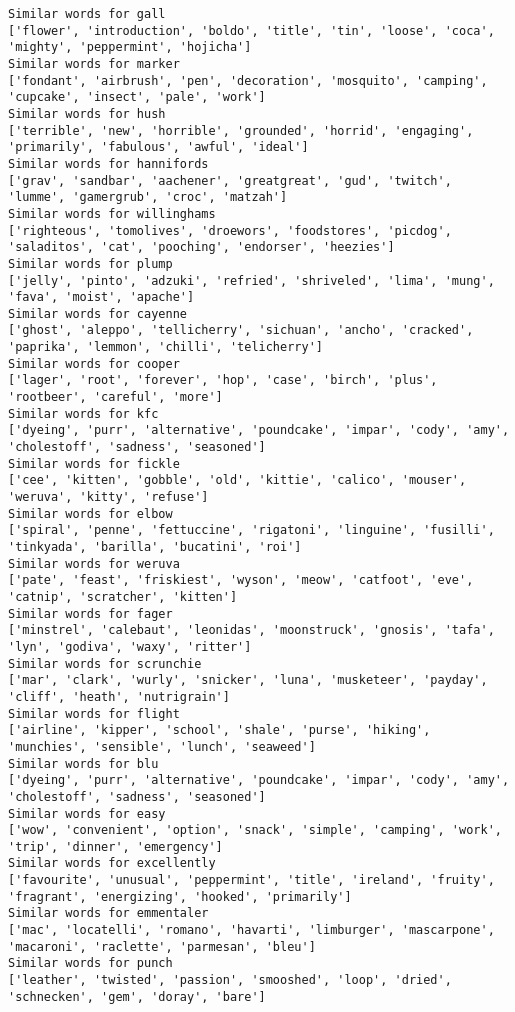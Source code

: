 \documentclass[11pt]{article}
\begin{document}
\begin{Verbatim}[commandchars=\\\{\}]
Similar words for gall
['flower', 'introduction', 'boldo', 'title', 'tin', 'loose', 'coca', 'mighty', 'peppermint', 'hojicha']
Similar words for marker
['fondant', 'airbrush', 'pen', 'decoration', 'mosquito', 'camping', 'cupcake', 'insect', 'pale', 'work']
Similar words for hush
['terrible', 'new', 'horrible', 'grounded', 'horrid', 'engaging', 'primarily', 'fabulous', 'awful', 'ideal']
Similar words for hannifords
['grav', 'sandbar', 'aachener', 'greatgreat', 'gud', 'twitch', 'lumme', 'gamergrub', 'croc', 'matzah']
Similar words for willinghams
['righteous', 'tomolives', 'droewors', 'foodstores', 'picdog', 'saladitos', 'cat', 'pooching', 'endorser', 'heezies']
Similar words for plump
['jelly', 'pinto', 'adzuki', 'refried', 'shriveled', 'lima', 'mung', 'fava', 'moist', 'apache']
Similar words for cayenne
['ghost', 'aleppo', 'tellicherry', 'sichuan', 'ancho', 'cracked', 'paprika', 'lemmon', 'chilli', 'telicherry']
Similar words for cooper
['lager', 'root', 'forever', 'hop', 'case', 'birch', 'plus', 'rootbeer', 'careful', 'more']
Similar words for kfc
['dyeing', 'purr', 'alternative', 'poundcake', 'impar', 'cody', 'amy', 'cholestoff', 'sadness', 'seasoned']
Similar words for fickle
['cee', 'kitten', 'gobble', 'old', 'kittie', 'calico', 'mouser', 'weruva', 'kitty', 'refuse']
Similar words for elbow
['spiral', 'penne', 'fettuccine', 'rigatoni', 'linguine', 'fusilli', 'tinkyada', 'barilla', 'bucatini', 'roi']
Similar words for weruva
['pate', 'feast', 'friskiest', 'wyson', 'meow', 'catfoot', 'eve', 'catnip', 'scratcher', 'kitten']
Similar words for fager
['minstrel', 'calebaut', 'leonidas', 'moonstruck', 'gnosis', 'tafa', 'lyn', 'godiva', 'waxy', 'ritter']
Similar words for scrunchie
['mar', 'clark', 'wurly', 'snicker', 'luna', 'musketeer', 'payday', 'cliff', 'heath', 'nutrigrain']
Similar words for flight
['airline', 'kipper', 'school', 'shale', 'purse', 'hiking', 'munchies', 'sensible', 'lunch', 'seaweed']
Similar words for blu
['dyeing', 'purr', 'alternative', 'poundcake', 'impar', 'cody', 'amy', 'cholestoff', 'sadness', 'seasoned']
Similar words for easy
['wow', 'convenient', 'option', 'snack', 'simple', 'camping', 'work', 'trip', 'dinner', 'emergency']
Similar words for excellently
['favourite', 'unusual', 'peppermint', 'title', 'ireland', 'fruity', 'fragrant', 'energizing', 'hooked', 'primarily']
Similar words for emmentaler
['mac', 'locatelli', 'romano', 'havarti', 'limburger', 'mascarpone', 'macaroni', 'raclette', 'parmesan', 'bleu']
Similar words for punch
['leather', 'twisted', 'passion', 'smooshed', 'loop', 'dried', 'schnecken', 'gem', 'doray', 'bare']

\end{Verbatim}
\end{document}
